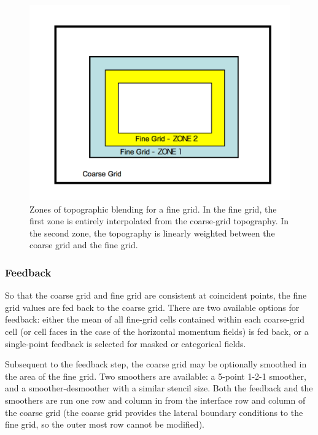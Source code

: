 %
%
\begin{figure} 
 \centering
  \includegraphics[width=4.5in]{figures/zone12.pdf}
  \caption{\label{figure:zone12} 
Zones of topographic blending
for a fine grid.  In the fine grid, the first zone is
entirely interpolated from the coarse-grid topography.  In
the second zone, the topography is linearly weighted between
the coarse grid and the fine grid.}
\end{figure}

\subsubsection{Feedback}
So that the coarse grid and fine grid are consistent at coincident points, the 
fine grid values are fed back to the coarse grid.
There are two available 
options for feedback: either the mean of all fine-grid cells contained 
within each coarse-grid cell (or cell faces in the case of the
horizontal momentum fields) is fed back, or a single-point feedback 
is selected for masked or categorical fields.

Subsequent to the feedback step, the coarse grid may be optionally smoothed in the area
of the fine grid.  Two smoothers are available: a 5-point 1-2-1 smoother, and a smoother-desmoother
with a similar stencil size.
Both the feedback and the smoothers are run one row and column in from the 
interface row and column of the coarse grid (the coarse grid provides
the lateral boundary conditions to the fine grid, so the outer most row
cannot be modified).

